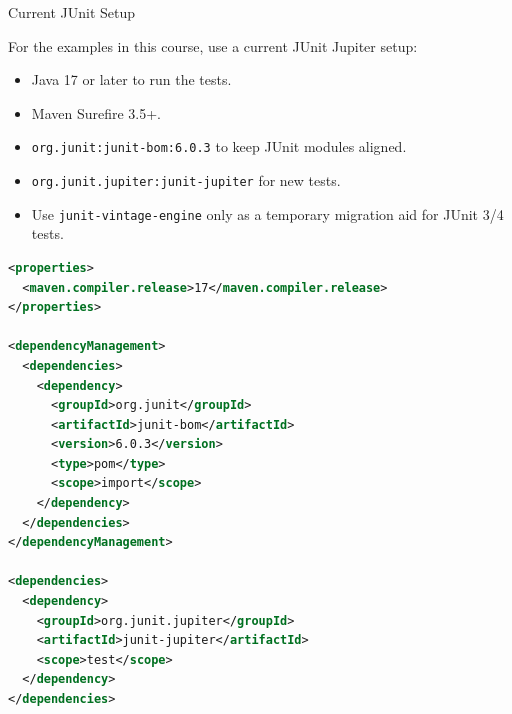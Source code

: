 \documentclass[11pt, xcolor=svgnames]{beamer}
\begin{document}
\begin{frame}[fragile]{Current JUnit Setup}

For the examples in this course, use a current JUnit Jupiter setup:

\begin{itemize}
  \item Java 17 or later to run the tests.
  \item Maven Surefire 3.5+.
  \item \texttt{org.junit:junit-bom:6.0.3} to keep JUnit modules aligned.
  \item \texttt{org.junit.jupiter:junit-jupiter} for new tests.
  \item Use \texttt{junit-vintage-engine} only as a temporary migration aid for JUnit 3/4 tests.
\end{itemize}

\begin{lstlisting}[language=XML,basicstyle=\tiny]
<properties>
  <maven.compiler.release>17</maven.compiler.release>
</properties>

<dependencyManagement>
  <dependencies>
    <dependency>
      <groupId>org.junit</groupId>
      <artifactId>junit-bom</artifactId>
      <version>6.0.3</version>
      <type>pom</type>
      <scope>import</scope>
    </dependency>
  </dependencies>
</dependencyManagement>

<dependencies>
  <dependency>
    <groupId>org.junit.jupiter</groupId>
    <artifactId>junit-jupiter</artifactId>
    <scope>test</scope>
  </dependency>
</dependencies>
\end{lstlisting}

\end{frame}






\end{document}
